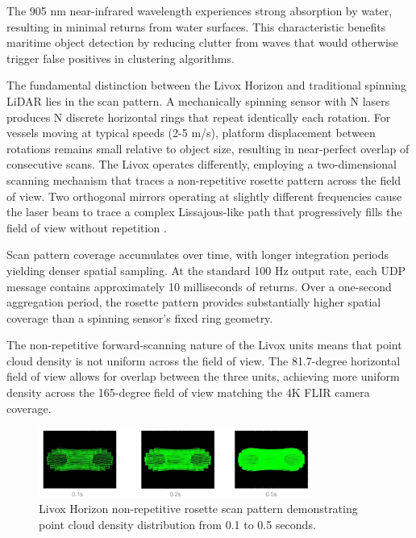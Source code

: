\documentclass{erauthesis}
\begin{document}
The 905 nm near-infrared wavelength experiences strong absorption by water, resulting in minimal returns from water surfaces.
This characteristic benefits maritime object detection by reducing clutter from waves that would otherwise trigger false positives in clustering algorithms.

The fundamental distinction between the Livox Horizon and traditional spinning \ac{LiDAR} lies in the scan pattern.
A mechanically spinning sensor with N lasers produces N discrete horizontal rings that repeat identically each rotation.
For vessels moving at typical speeds (2-5 m/s), platform displacement between rotations remains small relative to object size, resulting in near-perfect overlap of consecutive scans.
The Livox operates differently, employing a two-dimensional scanning mechanism that traces a non-repetitive rosette pattern across the field of view.
Two orthogonal mirrors operating at slightly different frequencies cause the laser beam to trace a complex Lissajous-like path that progressively fills the field of view without repetition \cite{thompson2023}.

Scan pattern coverage accumulates over time, with longer integration periods yielding denser spatial sampling.
At the standard 100 Hz output rate, each UDP message contains approximately 10 milliseconds of returns.
Over a one-second aggregation period, the rosette pattern provides substantially higher spatial coverage than a spinning sensor's fixed ring geometry.

The non-repetitive forward-scanning nature of the Livox units means that point cloud density is not uniform across the field of view.
The 81.7-degree horizontal field of view allows for overlap between the three units, achieving more uniform density across the 165-degree field of view matching the 4K FLIR camera coverage.

\begin{figure}[htbp]
\centering
\includegraphics[width=0.8\textwidth]{Images/Livox_1.png}
\caption{Livox Horizon non-repetitive rosette scan pattern demonstrating point cloud density distribution from 0.1 to 0.5 seconds.}
\label{fig:livox_scan_pattern}
\end{figure}
\end{document}
